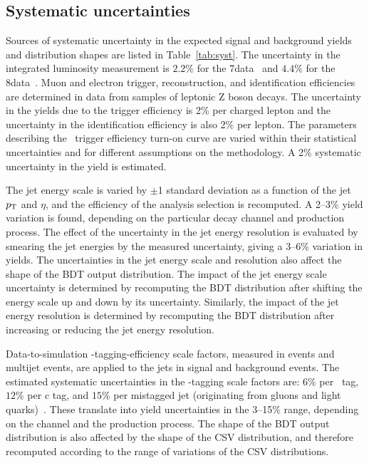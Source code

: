 \documentclass[12pt,twoside,a4paper,cmspaper,final,collab]{cms-tdr}
\begin{document}
\subsection{Systematic uncertainties}\label{sssec:hbb_Uncertainties}

Sources of systematic uncertainty
in the expected signal and background yields and distribution shapes
are listed in Table~\ref{tab:syst}.
The uncertainty in the integrated  luminosity measurement is $2.2\%$
for the 7\TeV data~\cite{CMS-PAS-EWK-11-001} and $4.4\%$ for the 8\TeV data~\cite{CMS:2012jza}.
Muon and electron trigger,
       reconstruction, and identification efficiencies are
       determined in data from samples of
       leptonic Z boson decays. The uncertainty in the yields due to the trigger efficiency is
       2\% per charged lepton and the uncertainty in the
       identification efficiency is also 2\% per lepton. The parameters describing the
       \ZnnH\ trigger efficiency turn-on curve are
       varied within their statistical uncertainties and for different
       assumptions on the methodology.
       A 2\% systematic uncertainty in the yield is estimated.

The jet energy scale is
       varied by $\pm$1  standard deviation as a function of the jet $p_{\mathrm{T}}$ and
       $\eta$, and the efficiency of the analysis selection is
       recomputed. A 2--3\%
       yield variation is found, depending on the particular decay channel
       and production process. The effect of the uncertainty
       in the jet energy resolution is evaluated by
       smearing the jet energies by the measured
       uncertainty, giving a 3--6\% variation in yields.
      The uncertainties in the jet energy scale and
       resolution also affect the shape of the BDT
       output distribution. The impact of the jet energy scale uncertainty is determined by recomputing
the BDT distribution after shifting the energy scale up and down by its
uncertainty.   Similarly, the impact of the jet energy resolution is
determined by recomputing the BDT distribution after increasing or
       reducing the jet energy
 resolution.


Data-to-simulation \cPqb-tagging-efficiency scale factors, measured in
\ttbar events and multijet events,
   are applied  to the jets in signal and background
       events. The estimated systematic uncertainties in the \cPqb-tagging scale factors are: $6\%$
       per \cPqb\ tag, $12\%$ per c tag, and $15\%$ per
       mistagged jet (originating from gluons and light quarks)~\cite{CMS-PAS-BTV-12-001}. These translate into yield uncertainties in the 3--15\%
       range, depending on the channel and the production process. The
       shape of the BDT output distribution is also affected by the shape of
       the CSV distribution, and therefore recomputed according to the
      range of variations of the CSV distributions.
\end{document}

